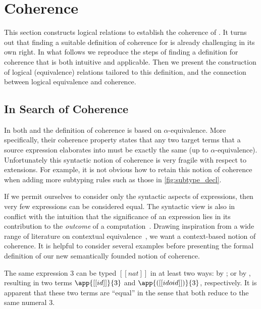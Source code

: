 
\section{Coherence}
\label{sec:cohe}

This section constructs logical relations to
establish the coherence of \name. It turns out that finding a
suitable definition of coherence for \name is already challenging in its own
right. In what follows we reproduce the steps of finding a definition for coherence
that is both intuitive and applicable. Then we present the
construction of logical (equivalence) relations tailored to this 
definition, and the connection between logical equivalence and coherence.



\subsection{In Search of Coherence}

In both \oname and \fname the definition of coherence is based on
$\alpha$-equivalence. More specifically, their coherence property states that
any two target terms that a source expression elaborates into must be exactly the same (up to
$\alpha$-equivalence). Unfortunately this syntactic notion of coherence is
very fragile with respect to extensions.
For example, it is not obvious how to retain this notion of coherence when adding more subtyping
rules such as those in \cref{fig:subtype_decl}.

If we permit ourselves to consider only the syntactic aspects of expressions,
then very few expressions can be considered equal. The syntactic view is also in conflict
with the intuition that the significance of an expression lies in its
contribution to the \textit{outcome} of a computation~\citep{Harper_2016}.
Drawing inspiration from a wide range of literature on contextual
equivalence~\citep{morris1969lambda}, we want a context-based notion of
coherence. It is helpful to consider several examples before presenting the
formal definition of our new semantically founded notion of coherence.

\begin{example} \label{eg:1}
The same \name expression $3$ can be typed $[[nat]]$ in at least two ways: by
; or by , resulting in two \tname
terms $\app{[[id]]}{3}$ and $\app{([[id o id]])}{3}$, respectively. It is apparent
that these two \tname terms are ``equal'' in the sense that both reduce to the
same numeral $3$.
\end{example}


